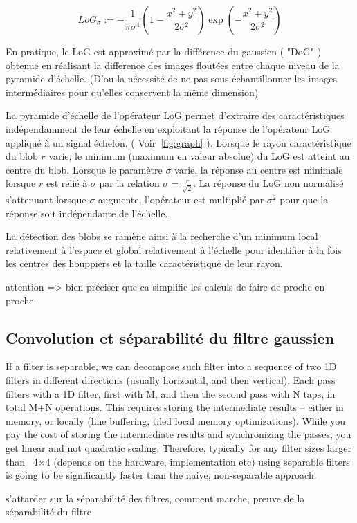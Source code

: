 \documentclass{article}
\begin{document}
	\[{LoG}_{\sigma}:=-\frac{1}{\pi\sigma^{4}}(1-\frac{x^{2}+y^{2}}{2\sigma^{2}})\exp(-\frac{x^{2}+y^{2}}{2\sigma^{2}})\] 

	En pratique, le LoG est approximé par la différence du gaussien ( "DoG" ) obtenue en réalisant la difference des images floutées entre chaque niveau de la pyramide d'échelle. (D'ou la nécessité de ne pas sous échantillonner les images intermédiaires pour qu'elles conservent la même dimension)

	La pyramide d'échelle de l'opérateur LoG permet d'extraire des caractéristiques indépendamment de leur échelle en exploitant la réponse de l'opérateur LoG appliqué à un signal échelon. ( Voir~\ref{fig:graph} ). Lorsque le rayon caractéristique du blob $r$ varie, le minimum (maximum en valeur absolue) du LoG est atteint au centre du blob. Lorsque le paramètre $\sigma$ varie, la réponse au centre est minimale lorsque $r$ est relié à $\sigma$ par la relation $\sigma=\frac{r}{\sqrt{2}}$. La réponse du LoG non normalisé s'attenuant lorsque $\sigma$ augmente, l'opérateur est multiplié par $\sigma^{2}$ pour que la réponse soit indépendante de l'échelle.

	La détection des blobs se ramène ainsi à la recherche d'un minimum local relativement à l'espace et global relativement à l'échelle pour identifier à la fois les centres des houppiers et la taille caractéristique de leur rayon. 


	attention => bien préciser que ca simplifie les calculs de faire de proche en proche. 
	
	\subsection{Convolution et séparabilité du filtre gaussien}
	If a filter is separable, we can decompose such filter into a sequence of two 1D filters in different directions (usually horizontal, and then vertical). Each pass filters with a 1D filter, first with M, and then the second pass with N taps, in total M+N operations. This requires storing the intermediate results – either in memory, or locally (line buffering, tiled local memory optimizations). While you pay the cost of storing the intermediate results and synchronizing the passes, you get linear and not quadratic scaling. Therefore, typically for any filter sizes larger than ~4×4 (depends on the hardware, implementation etc) using separable filters is going to be significantly faster than the naive, non-separable approach.

	s'attarder sur la séparabilité des filtres, comment marche, preuve de la séparabilité du filtre
\end{document}
